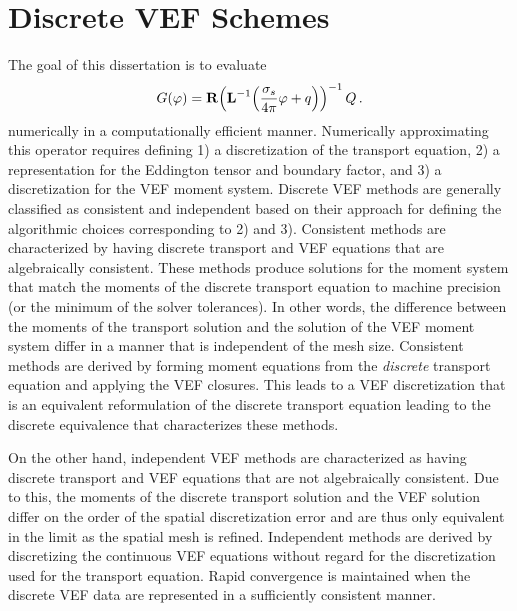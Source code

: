 \documentclass[../doc.tex]{subfiles}
\begin{document}
\section{Discrete VEF Schemes}
The goal of this dissertation is to evaluate 
	\begin{equation}
		G(\varphi) = \boldsymbol{\mathrm{R}}\!\left( \boldsymbol{\mathrm{L}}^{-1}\!\left( \frac{\sigma_s}{4\pi}\varphi + q \right) \right)^{-1} Q \,. 
	\end{equation}
numerically in a computationally efficient manner. Numerically approximating this operator requires defining 1) a discretization of the transport equation, 2) a representation for the Eddington tensor and boundary factor, and 3) a discretization for the VEF moment system. Discrete VEF methods are generally classified as consistent and independent based on their approach for defining the algorithmic choices corresponding to 2) and 3). Consistent methods are characterized by having discrete transport and VEF equations that are algebraically consistent. These methods produce solutions for the moment system that match the moments of the discrete transport equation to machine precision (or the minimum of the solver tolerances). In other words, the difference between the moments of the transport solution and the solution of the VEF moment system differ in a manner that is independent of the mesh size. Consistent methods are derived by forming moment equations from the \emph{discrete} transport equation and applying the VEF closures. This leads to a VEF discretization that is an equivalent reformulation of the discrete transport equation leading to the discrete equivalence that characterizes these methods. 

On the other hand, independent VEF methods are characterized as having discrete transport and VEF equations that are not algebraically consistent. Due to this, the moments of the discrete transport solution and the VEF solution differ on the order of the spatial discretization error and are thus only equivalent in the limit as the spatial mesh is refined. Independent methods are derived by discretizing the continuous VEF equations without regard for the discretization used for the transport equation. Rapid convergence is maintained when the discrete VEF data are represented in a sufficiently consistent manner. 
\end{document}
